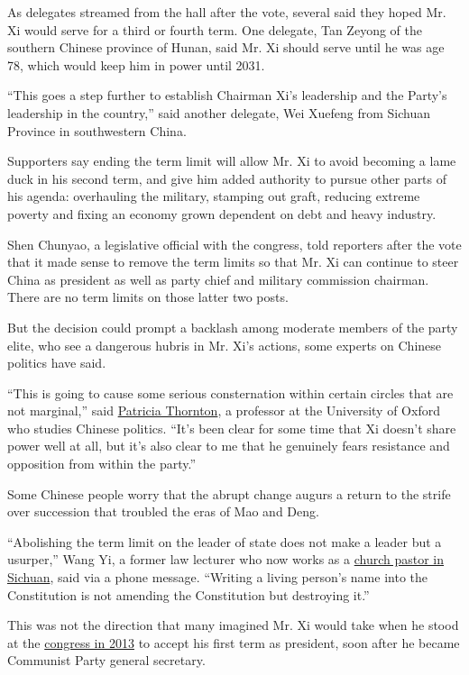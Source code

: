 As delegates streamed from the hall after the vote, several said they
hoped Mr. Xi would serve for a third or fourth term. One delegate, Tan
Zeyong of the southern Chinese province of Hunan, said Mr. Xi should
serve until he was age 78, which would keep him in power until 2031.

``This goes a step further to establish Chairman Xi's leadership and the
Party's leadership in the country,'' said another delegate, Wei Xuefeng
from Sichuan Province in southwestern China.

Supporters say ending the term limit will allow Mr. Xi to avoid becoming
a lame duck in his second term, and give him added authority to pursue
other parts of his agenda: overhauling the military, stamping out graft,
reducing extreme poverty and fixing an economy grown dependent on debt
and heavy industry.

Shen Chunyao, a legislative official with the congress, told reporters
after the vote that it made sense to remove the term limits so that Mr.
Xi can continue to steer China as president as well as party chief and
military commission chairman. There are no term limits on those latter
two posts.

But the decision could prompt a backlash among moderate members of the
party elite, who see a dangerous hubris in Mr. Xi's actions, some
experts on Chinese politics have said.

``This is going to cause some serious consternation within certain
circles that are not marginal,'' said
\href{https://www.merton.ox.ac.uk/people/professor-patricia-thornton}{Patricia
Thornton}, a professor at the University of Oxford who studies Chinese
politics. ``It's been clear for some time that Xi doesn't share power
well at all, but it's also clear to me that he genuinely fears
resistance and opposition from within the party.''

Some Chinese people worry that the abrupt change augurs a return to the
strife over succession that troubled the eras of Mao and Deng.

``Abolishing the term limit on the leader of state does not make a
leader but a usurper,'' Wang Yi, a former law lecturer who now works as
a
\href{https://www.theatlantic.com/international/archive/2017/04/china-unregistered-churches-driving-religious-revolution/521544/}{church
pastor in Sichuan}, said via a phone message. ``Writing a living
person's name into the Constitution is not amending the Constitution but
destroying it.''

This was not the direction that many imagined Mr. Xi would take when he
stood at the
\href{http://www.nytimes.com/2012/11/15/world/asia/communists-conclude-party-congress-in-china.html}{congress
in 2013} to accept his first term as president, soon after he became
Communist Party general secretary.


